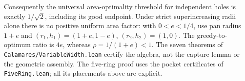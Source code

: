Consequently the universal area-optimality threshold for independent
holes is exactly $1/\sqrt2$, including its good endpoint. Under strict
superincreasing radii alone there is no positive uniform area factor: with
$0<e<1/4$, use pan radius $1+e$ and
$(r_1,h_1)=(1+e,1-e)$, $(r_2,h_2)=(1,0)$. The greedy-to-optimum
ratio is $4e$, whereas $\rho=1/(1+e)<1$. The seven theorems of
\texttt{Calamares/VariableWidth.lean} certify the algebra, not the
capture lemma or the geometric assembly. The five-ring proof uses the
pocket certificates of \texttt{FiveRing.lean}; all its placements above
are explicit.
